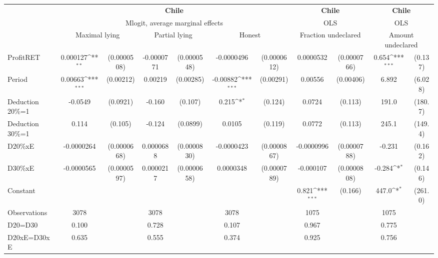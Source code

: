 \def\sym#1{\ifmmode^{#1}\else\(^{#1}\)\fi}
\begin{tabular}{l|cccccc|cc|cc}
\hline\hline
&\multicolumn{6}{c|}{\bf Chile}&\multicolumn{2}{c|}{\bf Chile}&\multicolumn{2}{c}{\bf Chile}\\ &\multicolumn{6}{c|}{Mlogit, average marginal effects }&\multicolumn{2}{c|}{OLS}&\multicolumn{2}{c}{OLS}\\
                &\multicolumn{2}{c}{Maximal lying}&\multicolumn{2}{c}{Partial lying}&\multicolumn{2}{c}{Honest}  &\multicolumn{2}{c}{Fraction undeclared}&\multicolumn{2}{c}{Amount undeclared}\\
\hline
ProfitRET       & 0.000127\sym{**} &(0.0000508)&-0.0000771         &(0.0000548)&-0.0000496         &(0.0000612)&0.0000532         &(0.0000766)&    0.654\sym{***}&  (0.137)\\
Period          &  0.00663\sym{***}&(0.00212)&  0.00219         &(0.00285)& -0.00882\sym{***}&(0.00291)&  0.00556         &(0.00406)&    6.892         &  (6.028)\\
Deduction 20\%=1&  -0.0549         & (0.0921)&   -0.160         &  (0.107)&    0.215\sym{*}  &  (0.124)&   0.0724         &  (0.113)&    191.0         &  (180.7)\\
Deduction 30\%=1&    0.114         &  (0.105)&   -0.124         & (0.0899)&   0.0105         &  (0.119)&   0.0772         &  (0.113)&    245.1         &  (149.4)\\
D20\%xE         &-0.0000264         &(0.0000668)&0.0000688         &(0.0000830)&-0.0000423         &(0.0000867)&-0.0000996         &(0.0000788)&   -0.231         &  (0.162)\\
D30\%xE         &-0.0000565         &(0.0000597)&0.0000217         &(0.0000658)&0.0000348         &(0.0000789)&-0.000107         &(0.0000808)&   -0.284\sym{*}  &  (0.146)\\
Constant        &                  &         &                  &         &                  &         &    0.821\sym{***}&  (0.166)&    447.0\sym{*}  &  (261.0)\\
\hline
Observations    &     3078         &         &     3078         &         &     3078         &         &     1075         &         &     1075         &         \\
D20=D30         &    0.100         &         &    0.728         &         &    0.107         &         &    0.967         &         &    0.775         &         \\
D20xE=D30xE     &    0.635         &         &    0.555         &         &    0.374         &         &    0.925         &         &    0.756         &         \\

\end{tabular}
